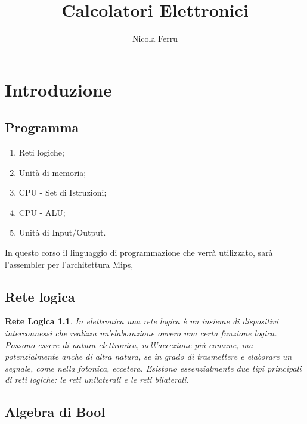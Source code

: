 \documentclass{book}
\title{Calcolatori Elettronici}
\author{Nicola Ferru}
\begin{document}
\maketitle
\chapter{Introduzione}
\section{Programma}
\begin{enumerate}
	\item Reti logiche;
	\item Unità di memoria;
	\item CPU - Set di Istruzioni;
	\item CPU - ALU;
	\item Unità di Input/Output.
\end{enumerate}
In questo corso il linguaggio di programmazione che verrà utilizzato, sarà l'assembler per l'architettura Mips, 
\section{Rete logica}
\newtheorem{Rlogica}{Rete Logica}
\begin{Rlogica}
In elettronica una rete logica è un insieme di dispositivi interconnessi che realizza un'elaborazione ovvero una certa funzione logica. Possono essere di natura elettronica, nell'accezione più comune, ma potenzialmente anche di altra natura, se in grado di trasmettere e elaborare un segnale, come nella fotonica, eccetera. Esistono essenzialmente due tipi principali di reti logiche: le reti unilaterali e le reti bilaterali.
\end{Rlogica}
\section{Algebra di Bool}
\end{document}
